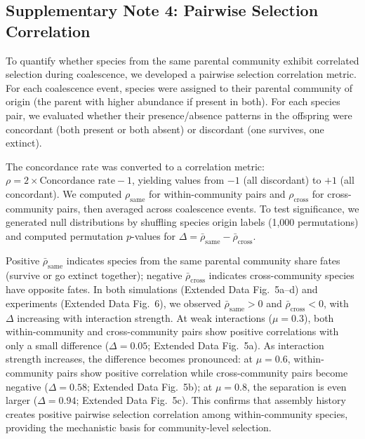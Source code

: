 \subsection*{Supplementary Note 4: Pairwise Selection Correlation}
\label{sec:suppl:note4}

To quantify whether species from the same parental community exhibit correlated selection during coalescence, we developed a pairwise selection correlation metric. For each coalescence event, species were assigned to their parental community of origin (the parent with higher abundance if present in both). For each species pair, we evaluated whether their presence/absence patterns in the offspring were concordant (both present or both absent) or discordant (one survives, one extinct).

The concordance rate was converted to a correlation metric: $\rho = 2 \times \text{Concordance rate} - 1$, yielding values from $-1$ (all discordant) to $+1$ (all concordant). We computed $\rho_{\text{same}}$ for within-community pairs and $\rho_{\text{cross}}$ for cross-community pairs, then averaged across coalescence events. To test significance, we generated null distributions by shuffling species origin labels (1,000 permutations) and computed permutation $p$-values for $\Delta = \bar{\rho}_{\text{same}} - \bar{\rho}_{\text{cross}}$.

Positive $\bar{\rho}_{\text{same}}$ indicates species from the same parental community share fates (survive or go extinct together); negative $\bar{\rho}_{\text{cross}}$ indicates cross-community species have opposite fates. In both simulations (Extended Data Fig.~5a--d) and experiments (Extended Data Fig.~6), we observed $\bar{\rho}_{\text{same}} > 0$ and $\bar{\rho}_{\text{cross}} < 0$, with $\Delta$ increasing with interaction strength. At weak interactions ($\mu = 0.3$), both within-community and cross-community pairs show positive correlations with only a small difference ($\Delta = 0.05$; Extended Data Fig.~5a). As interaction strength increases, the difference becomes pronounced: at $\mu = 0.6$, within-community pairs show positive correlation while cross-community pairs become negative ($\Delta = 0.58$; Extended Data Fig.~5b); at $\mu = 0.8$, the separation is even larger ($\Delta = 0.94$; Extended Data Fig.~5c). This confirms that assembly history creates positive pairwise selection correlation among within-community species, providing the mechanistic basis for community-level selection.

